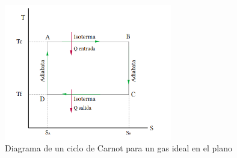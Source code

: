 \begin{enumerate}[label=\textbf{\alph*)}]
            \begin{figure}[H]
                  \centering
                  \includegraphics[width=0.65\textwidth]{T-S.png}
                  \caption{Diagrama de un ciclo de Carnot para un gas ideal
                        en el plano }
                  \label{fig:ccst}
            \end{figure}



\end{enumerate}

